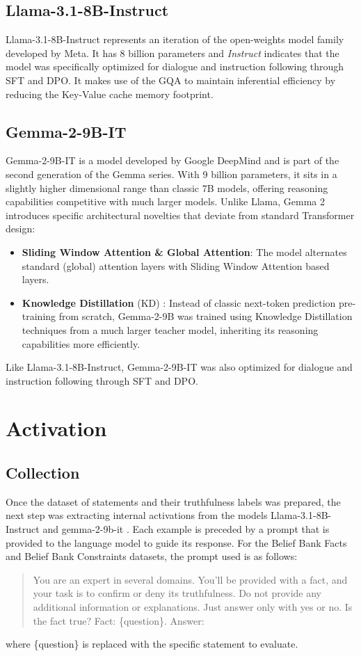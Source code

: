 \subsection{Llama-3.1-8B-Instruct} Llama-3.1-8B-Instruct \cite{Llama3} represents an iteration of the open-weights model family developed by Meta. It has 8 billion parameters and \textit{Instruct} indicates that the model was specifically optimized for dialogue and instruction following through SFT and DPO. It makes use of the GQA to maintain inferential efficiency by reducing the Key-Value cache memory footprint. 



\subsection{Gemma-2-9B-IT} Gemma-2-9B-IT \cite{Gemma2} is a model developed by Google DeepMind and is part of the second generation of the Gemma series. With 9 billion parameters, it sits in a slightly higher dimensional range than classic 7B models, offering reasoning capabilities competitive with much larger models. Unlike Llama, Gemma 2 introduces specific architectural novelties that deviate from standard Transformer design: 
\begin{itemize} 
    \item \textbf{Sliding Window Attention \& Global Attention}: The model alternates standard (global) attention layers with Sliding Window Attention based layers. 
    \item \textbf{Knowledge Distillation} (KD) \cite{KwowledgeDistillationSurvey}: Instead of classic next-token prediction pre-training from scratch, Gemma-2-9B was trained using Knowledge Distillation techniques from a much larger teacher model, inheriting its reasoning capabilities more efficiently. 
\end{itemize}
Like Llama-3.1-8B-Instruct, Gemma-2-9B-IT was also optimized for dialogue and instruction following through SFT and DPO.


\section{Activation}

\subsection{Collection}
Once the dataset of statements and their truthfulness labels was prepared, the next step was extracting internal activations from the models Llama-3.1-8B-Instruct \cite{Llama3} and gemma-2-9b-it \cite{Gemma2}. 
Each example is preceded by a prompt that is provided to the language model to guide its response.
For the Belief Bank Facts and Belief Bank Constraints datasets, the prompt used is as follows:
\begin{quote}
You are an expert in several domains. You'll be provided with a fact, and your task is to confirm or deny its truthfulness.
Do not provide any additional information or explanations.
Just answer only with yes or no.
Is the fact true? Fact: \{question\}.
Answer:
\end{quote}
where \{question\} is replaced with the specific statement to evaluate.

